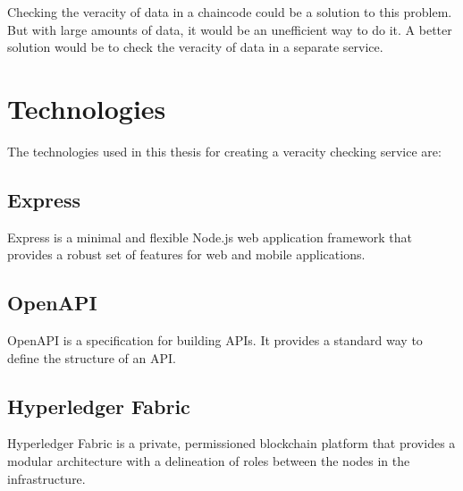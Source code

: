 Checking the veracity of data in a chaincode could be a solution to this problem. But with large amounts of data, it would be an unefficient way to do it. A better solution would be to check the veracity of data in a separate service.

\section{Technologies}

The technologies used in this thesis for creating a veracity checking service are:

\subsection{Express}

Express is a minimal and flexible Node.js web application framework that provides a robust set of features for web and mobile applications.

\subsection{OpenAPI}

OpenAPI is a specification for building APIs. It provides a standard way to define the structure of an API.

\subsection{Hyperledger Fabric}

Hyperledger Fabric is a private, permissioned blockchain platform that provides a modular architecture with a delineation of roles between the nodes in the infrastructure.